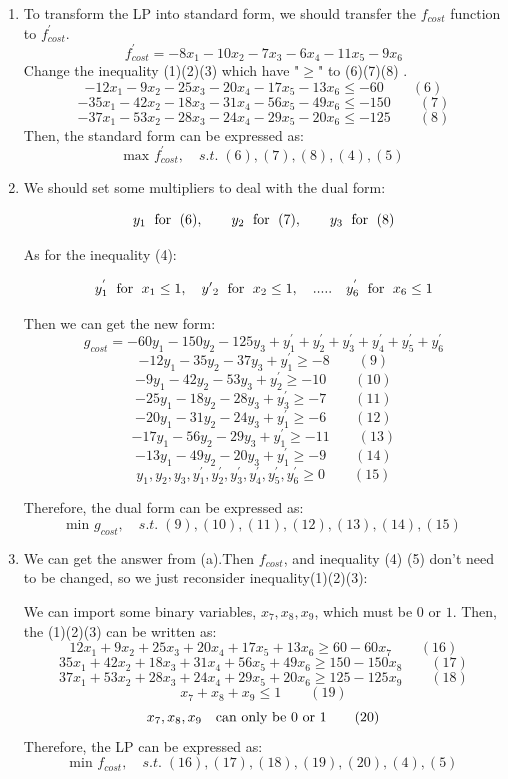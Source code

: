 \documentclass[12pt,a4paper]{article}
\theoremstyle{definition}
\begin{document}
\begin{enumerate}
\begin{enumerate}
    	\item
    	To transform the LP into standard form, we should transfer the $f_{cost}$ function to $f_{cost}^{'}$. 
    	$$f_{cost}^{'}=-8x_1-10x_2-7x_3-6x_4-11x_5-9x_6 $$
    	Change the inequality (1)(2)(3) which have "$\geq$" to (6)(7)(8) .
    	$$-12x_1-9x_2-25x_3-20x_4-17x_5-13x_6\leq-60 \qquad(6) $$
     	$$-35x_1-42x_2-18x_3-31x_4-56x_5-49x_6\leq -150\qquad(7) $$
    	$$-37x_1-53x_2-28x_3-24x_4-29x_5-20x_6\leq-125\qquad(8)$$
    	Then, the standard form can be expressed as:
    		$$\text{max } f_{cost}^{'}, \quad s.t.\; (6),(7),(8),(4),(5)$$
    	\item 
    	We should set some multipliers to deal with the dual form:
    	
    	$$y_1 \text{\; for\; } (6), \qquad y_2 \text{\; for\; } (7), \qquad y_3 \text{\; for\; }(8)$$
    	
    	As for the inequality (4):
    	
    	$$y^{'}_1\text{\; for\; } x_1\leq1,\quad y{'}_{2} \text{\; for\; } x_2 \leq 1,  \quad.....  \quad y^{'}_6 \text{\; for\; } x_6\leq1$$     	
    	
    	Then we can get the new form:
    	$$g_{cost}=-60y_1-150y_2-125y_3+y^{'}_1+y^{'}_2+y^{'}_3+y^{'}_4+y^{'}_5+y^{'}_6$$    	
    	$$-12y_1-35y_2-37y_3+y^{'}_1\geq -8 \qquad(9) $$
    	$$-9y_1-42y_2-53y_3+y^{'}_2\geq -10 \qquad(10) $$
    	$$-25y_1-18y_2-28y_3+y^{'}_3\geq -7 \qquad(11) $$
    	$$-20y_1-31y_2-24y_3+y^{'}_1\geq -6 \qquad(12) $$   
    	$$-17y_1-56y_2-29y_3+y^{'}_1\geq -11 \qquad(13) $$
    	$$-13y_1-49y_2-20y_3+y^{'}_1\geq -9 \qquad(14) $$ 	
    	$$y_1,y_2,y_3,y^{'}_1,y^{'}_2,y^{'}_3,y^{'}_4,y^{'}_5,y^{'}_6\geq0 \qquad(15)$$
    	
    	Therefore, the dual form can be expressed as:
    	$$\text{min } g_{cost}, \quad s.t.\; (9),(10),(11),(12),(13),(14),(15)$$
    	
    	\item 
    	We can get the answer from (a).Then $f_{cost}$, and inequality (4) (5) don't  need to be changed, so we just reconsider inequality(1)(2)(3):
    	
    	We can import some binary variables, $x_7,x_8,x_9$, which must be $0$ or $1$.
    	Then, the (1)(2)(3) can be written as:
    		$$12x_1+9x_2+25x_3+20x_4+17x_5+13x_6\geq60-60x_7 \qquad(16) $$
    	$$35x_1+42x_2+18x_3+31x_4+56x_5+49x_6\geq 150-150x_8\qquad(17) $$
    	$$37x_1+53x_2+28x_3+24x_4+29x_5+20x_6\geq125-125x_9\qquad(18)$$
    	$$x_7+x_8+x_9\leq 1\qquad(19)$$ 
        $$x_7,x_8,x_9 \text{\quad can only be 0 or 1}\qquad (20)$$    
        Therefore, the LP can be expressed as:
        $$\text{min } f_{cost}, \quad s.t.\; (16),(17),(18),(19),(20),(4),(5)$$
\end{enumerate}	   	
    	   	

\end{enumerate}
\end{document}
